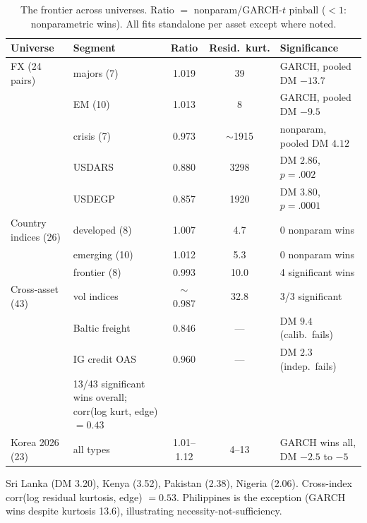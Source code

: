 \documentclass[11pt]{article}
\theoremstyle{remark}
\begin{document}
\begin{table}[t]
\centering
\begin{threeparttable}
\caption{The frontier across universes. Ratio $=$
nonparam/GARCH-$t$ pinball ($<1$: nonparametric wins). All fits
standalone per asset except where noted.}
\label{tab:universes}
\begin{tabular}{llccl}
\toprule
Universe & Segment & Ratio & Resid.\ kurt. & Significance \\
\midrule
FX (24 pairs) & majors (7) & 1.019 & 39 & GARCH, pooled DM $-13.7$ \\
 & EM (10) & 1.013 & 8 & GARCH, pooled DM $-9.5$ \\
 & crisis (7) & 0.973 & $\sim$1915 & nonparam, pooled DM $4.12$ \\
 & \quad USDARS & 0.880 & 3298 & DM $2.86$, $p=.002$ \\
 & \quad USDEGP & 0.857 & 1920 & DM $3.80$, $p=.0001$ \\
\midrule
Country indices (26) & developed (8) & 1.007 & 4.7 & 0 nonparam wins \\
 & emerging (10) & 1.012 & 5.3 & 0 nonparam wins \\
 & frontier (8) & 0.993 & 10.0 & 4 significant wins\tnote{a} \\
\midrule
Cross-asset (43) & vol indices & $\sim$0.987 & 32.8 & 3/3 significant \\
 & Baltic freight & 0.846 & --- & DM $9.4$ (calib.\ fails) \\
 & IG credit OAS & 0.960 & --- & DM $2.3$ (indep.\ fails) \\
 & 13/43 significant wins overall; corr(log kurt, edge) $= 0.43$ & & & \\
\midrule
Korea 2026 (23) & all types & 1.01--1.12 & 4--13 & GARCH wins all, DM $-2.5$ to $-5$ \\
\bottomrule
\end{tabular}
\begin{tablenotes}\footnotesize
\item[a] Sri Lanka (DM 3.20), Kenya (3.52), Pakistan (2.38), Nigeria
(2.06). Cross-index corr(log residual kurtosis, edge) $= 0.53$.
Philippines is the exception (GARCH wins despite kurtosis 13.6),
illustrating necessity-not-sufficiency.
\end{tablenotes}
\end{threeparttable}
\end{table}
\end{document}
